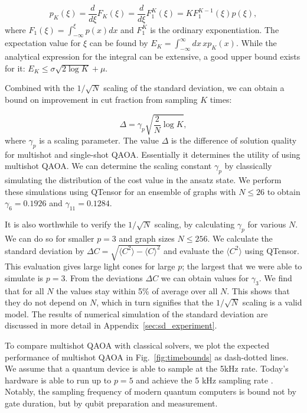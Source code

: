 \begin{equation}
    p_K(\xi) = \frac{d}{d\xi} F_K(\xi) =\frac{d}{d\xi} F_1^K(\xi)
    = K F_1^{K-1}(\xi) p(\xi),
\end{equation}
where  $F_1(\xi) = \int_{-\infty}^\xi p(x) d x$ and $F_1^K$ is the ordinary exponentiation.
The expectation value for $\xi$ can be found by $E_K = \int_{-\infty}^\infty d x \, x p_K(x)$.
While the analytical expression for the integral can be extensive,  a good upper bound exists for it: $E_K\leq \sigma\sqrt{2 \log K} + \mu$.

Combined with the $1/\sqrt N$ scaling of the standard deviation, we can obtain a bound on
improvement in cut fraction from sampling $K$ times:

\begin{equation}
\label{eq:multi-shot}
    \Delta = \gamma_p\sqrt{\frac{2}{N} \log K},
\end{equation}
where $\gamma_p$ is a scaling parameter.
The value $\Delta$ is the difference of solution quality for multishot and single-shot QAOA. Essentially it determines the utility of using multishot QAOA.
We can determine the scaling constant $\gamma_p$ by classically simulating
the distribution of the cost value in the ansatz state. 
We perform these simulations using QTensor for an ensemble of graphs with $N\leq 26$ to obtain
$\gamma_6 = 0.1926$ and $\gamma_{11} = 0.1284$.

It is also worthwhile to verify the $1/\sqrt N$ scaling,
by calculating $\gamma_p$ for various $N$. We can do so for smaller $p=3$ and graph sizes $N\leq256$.
We calculate the standard deviation by $\Delta C= \sqrt{\langle C^2 \rangle - \langle C \rangle ^2}$ and evaluate the $\langle C^2 \rangle$ using QTensor. This evaluation gives large light cones for large $p$;  the largest that we were able to simulate is $p=3$.
From the deviations $\Delta C$ we can obtain values for $\gamma_3$. We find that for all $N$ the values stay within 5\% of average over all $N$. This shows that they do not depend on $N$, which in turn signifies that the $1/\sqrt N$ scaling is a valid model. The results of numerical simulation of the standard deviation are discussed in more detail in Appendix~\ref{sec:sd_experiment}.


To compare multishot QAOA with classical solvers, we plot the expected performance of multishot QAOA in Fig.~\ref{fig:timebounds} as dash-dotted lines. We assume that a quantum device is able to sample at the 5kHz rate. Today's hardware is able to run up to $p=5$ and achieve the 5 kHz sampling rate \cite{Harrigan2021}.
Notably, the sampling frequency of modern quantum computers is bound not by gate duration, but by 
qubit preparation and measurement.


